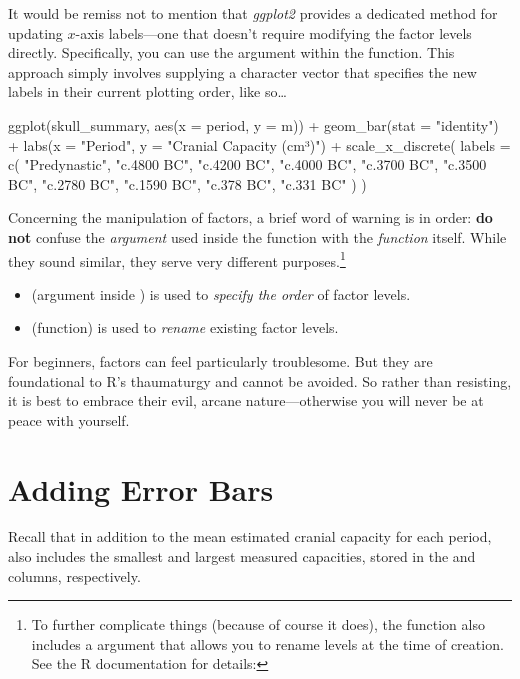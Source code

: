 It would be remiss not to mention that \textit{ggplot2} provides a dedicated method for updating $x$-axis labels—one that doesn’t require modifying the factor levels directly. Specifically, you can use the  argument within the  function. This approach simply involves supplying a character vector that specifies the new labels in their current plotting order, like so…

\begin{inRhigh}[highlightlines={4-8}]
ggplot(skull_summary, aes(x = period, y = m)) +
  geom_bar(stat = "identity") +
  labs(x = "Period", y = "Cranial Capacity (cm³)") +
  scale_x_discrete(
    labels = c(
      "Predynastic", "c.4800 BC", "c.4200 BC", "c.4000 BC", "c.3700 BC",
      "c.3500 BC", "c.2780 BC", "c.1590 BC", "c.378 BC", "c.331 BC"
      )
  )
\end{inRhigh}

Concerning the manipulation of factors, a brief word of warning is in order: \textbf{do not} confuse the  \textit{argument} used inside the  function with the  \textit{function} itself. While they sound similar, they serve very different purposes.\footnote{To further complicate things (because of course it does), the  function also includes a  argument that allows you to rename levels at the time of creation. See the R documentation for details: }

\begin{itemize}
    \item {} (argument inside ) is used to \textit{specify the order} of factor levels.
    \item {} (function) is used to \textit{rename} existing factor levels.
\end{itemize}

For beginners, factors can feel particularly troublesome. But they are foundational to R's thaumaturgy and cannot be avoided. So rather than resisting, it is best to embrace their evil, arcane nature—otherwise you will never be at peace with yourself.

\section{Adding Error Bars}

Recall that in addition to the mean estimated cranial capacity for each period,  also includes the smallest and largest measured capacities, stored in the  and  columns, respectively.

